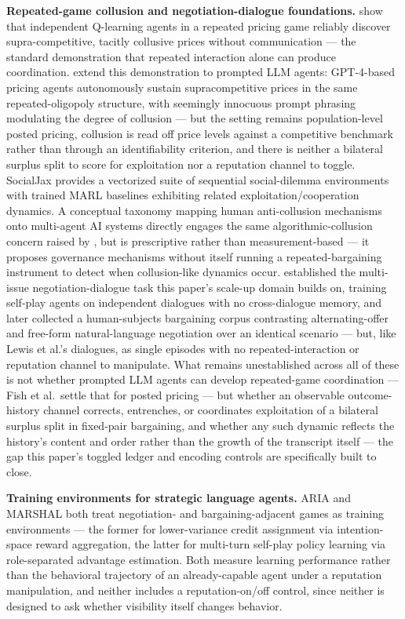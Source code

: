 \documentclass[11pt]{article}
\begin{document}
\textbf{Repeated-game collusion and negotiation-dialogue foundations.} \citet{calvano2020} show that independent Q-learning agents in a repeated pricing game reliably discover supra-competitive, tacitly collusive prices without communication --- the standard demonstration that repeated interaction alone can produce coordination. \citet{fish2024algorithmic} extend this demonstration to prompted LLM agents: GPT-4-based pricing agents autonomously sustain supracompetitive prices in the same repeated-oligopoly structure, with seemingly innocuous prompt phrasing modulating the degree of collusion --- but the setting remains population-level posted pricing, collusion is read off price levels against a competitive benchmark rather than through an identifiability criterion, and there is neither a bilateral surplus split to score for exploitation nor a reputation channel to toggle. SocialJax \citep{socialjax} provides a vectorized suite of sequential social-dilemma environments with trained MARL baselines exhibiting related exploitation/cooperation dynamics. A conceptual taxonomy mapping human anti-collusion mechanisms onto multi-agent AI systems \citep{anticollusionmapping2601} directly engages the same algorithmic-collusion concern raised by \citet{calvano2020}, but is prescriptive rather than measurement-based --- it proposes governance mechanisms without itself running a repeated-bargaining instrument to detect when collusion-like dynamics occur. \citet{lewis2017} established the multi-issue negotiation-dialogue task this paper's scale-up domain builds on, training self-play agents on independent dialogues with no cross-dialogue memory, and \citet{heddaya2023} later collected a human-subjects bargaining corpus contrasting alternating-offer and free-form natural-language negotiation over an identical scenario --- but, like Lewis et al.'s dialogues, as single episodes with no repeated-interaction or reputation channel to manipulate. What remains unestablished across all of these is not whether prompted LLM agents can develop repeated-game coordination --- Fish et al.\ settle that for posted pricing --- but whether an observable outcome-history channel corrects, entrenches, or coordinates exploitation of a bilateral surplus split in fixed-pair bargaining, and whether any such dynamic reflects the history's content and order rather than the growth of the transcript itself --- the gap this paper's toggled ledger and encoding controls are specifically built to close.

\textbf{Training environments for strategic language agents.} ARIA \citep{aria} and MARSHAL \citep{marshal} both treat negotiation- and bargaining-adjacent games as training environments --- the former for lower-variance credit assignment via intention-space reward aggregation, the latter for multi-turn self-play policy learning via role-separated advantage estimation. Both measure learning performance rather than the behavioral trajectory of an already-capable agent under a reputation manipulation, and neither includes a reputation-on/off control, since neither is designed to ask whether visibility itself changes behavior.
\end{document}

